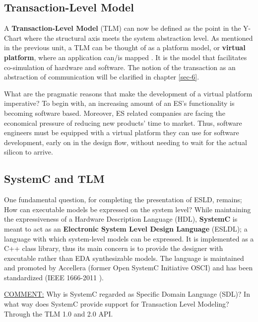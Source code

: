 \documentclass[12pt,twoside]{article}
\begin{document}
\subsection{Transaction-Level Model}
\label{sec-3-4}
A \textbf{Transaction-Level Model} (TLM) can now be defined as the point in the Y-Chart where the structural axis meets the system abstraction level.
As mentioned in the previous unit, a TLM can be thought of as a platform model, or \textbf{virtual platform}, where an application can/is mapped \cite{Rigo2011}.
It is the model that facilitates co-simulation of hardware and software.
The notion of the transaction as an abstraction of communication will be clarified in chapter \ref{sec-6}.

What are the pragmatic reasons that make the development of a virtual platform imperative?
To begin with, an increasing amount of an ES's functionality is becoming software based. 
Moreover, ES related companies are facing the economical pressure of reducing new products' time to market.
Thus, software engineers must be equipped with a virtual platform they can use for software development, early on in the design flow, without needing to wait for the actual silicon to arrive.


\subsection{SystemC and TLM}
\label{sec-3-5}
One fundamental question, for completing the presentation of ESLD, remains; How can executable models be expressed on the system level?
While maintaining the expressiveness of a Hardware Description Language (HDL), \textbf{SystemC} is meant to act as an \textbf{Electronic System Level Design Language} (ESLDL);
a language with which system-level models can be expressed.
It is implemented as a C++ class library, thus its main concern is to provide the designer with executable rather than EDA synthesizable models.
The language is maintained and promoted by Accellera (former Open SystemC Initiative OSCI) and has been standardized (IEEE 1666-2011 \cite{OpenSystemCInitiative2012}).

\uline{COMMENT:} Why is SystemC regarded as Specific Domain Language (SDL)?
In what way does SystemC provide support for Transaction Level Modeling? Through the TLM 1.0 and 2.0 API.
\end{document}
